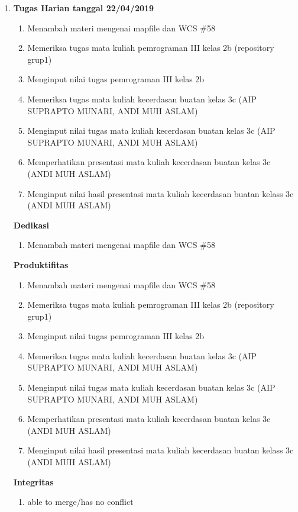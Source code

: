 \begin{enumerate}
\item \textbf{Tugas Harian tanggal 22/04/2019}
\begin{enumerate}
\item Menambah materi mengenai mapfile dan WCS \#58
\item Memeriksa tugas mata kuliah pemrograman III kelas 2b (repository grup1)
\item Menginput  nilai tugas pemrograman III kelas 2b
\item Memeriksa tugas mata kuliah kecerdasan buatan kelas 3c (AIP SUPRAPTO MUNARI, ANDI MUH ASLAM)
\item Menginput nilai tugas mata kuliah kecerdasan buatan kelas 3c (AIP SUPRAPTO MUNARI, ANDI MUH ASLAM)
\item Memperhatikan presentasi mata kuliah kecerdasan buatan kelas 3c (ANDI MUH ASLAM) 
\item Menginput nilai hasil presentasi mata kuliah kecerdasan buatan kelass 3c (ANDI MUH ASLAM)
\end{enumerate}

\textbf{Dedikasi}
\begin{enumerate}
\item Menambah materi mengenai mapfile dan WCS \#58
\end{enumerate}

\textbf{Produktifitas}
\begin{enumerate}
\item Menambah materi mengenai mapfile dan WCS \#58
\item Memeriksa tugas mata kuliah pemrograman III kelas 2b (repository grup1)
\item Menginput  nilai tugas pemrograman III kelas 2b
\item Memeriksa tugas mata kuliah kecerdasan buatan kelas 3c (AIP SUPRAPTO MUNARI, ANDI MUH ASLAM)
\item Menginput nilai tugas mata kuliah kecerdasan buatan kelas 3c (AIP SUPRAPTO MUNARI, ANDI MUH ASLAM)
\item Memperhatikan presentasi mata kuliah kecerdasan buatan kelas 3c (ANDI MUH ASLAM) 
\item Menginput nilai hasil presentasi mata kuliah kecerdasan buatan kelass 3c (ANDI MUH ASLAM) 
\end{enumerate}

\textbf{Integritas}
\begin{enumerate}
\item able to merge/has no conflict
\end{enumerate}


\end{enumerate}
